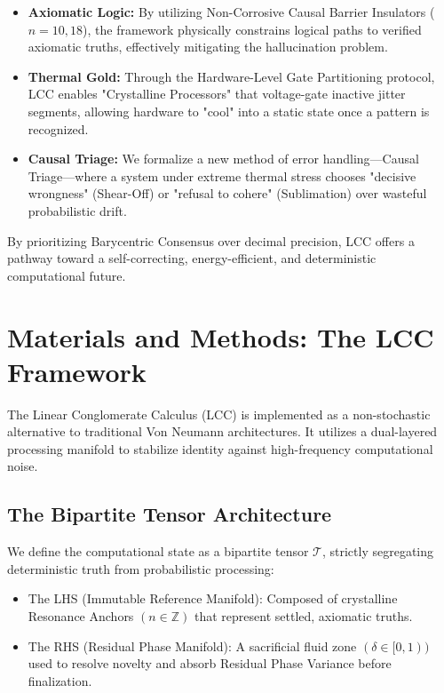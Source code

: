 \documentclass[fleqn,10pt,lineno]{wlpeerj}
\begin{document}
\begin{itemize}
\item\textbf{Axiomatic Logic:} By utilizing Non-Corrosive Causal Barrier Insulators ($n=10, 18$), the framework physically constrains logical paths to verified axiomatic truths, effectively mitigating the hallucination problem.
\item\textbf{Thermal Gold:} Through the Hardware-Level Gate Partitioning protocol, LCC enables "Crystalline Processors" that voltage-gate inactive jitter segments, allowing hardware to "cool" into a static state once a pattern is recognized.
\item\textbf{Causal Triage:} We formalize a new method of error handling—Causal Triage—where a system under extreme thermal stress chooses "decisive wrongness" (Shear-Off) or "refusal to cohere" (Sublimation) over wasteful probabilistic drift.
\end{itemize}

By prioritizing Barycentric Consensus over decimal precision, LCC offers a pathway toward a self-correcting, energy-efficient, and deterministic computational future.

\section*{Materials and Methods: The LCC Framework}
The Linear Conglomerate Calculus (LCC) is implemented as a non-stochastic alternative to traditional Von Neumann architectures. It utilizes a dual-layered processing manifold to stabilize identity against high-frequency computational noise.

\subsection*{The Bipartite Tensor Architecture}
We define the computational state as a bipartite tensor $\mathcal{T}$, strictly segregating deterministic truth from probabilistic processing:
\begin{itemize}
\item The LHS (Immutable Reference Manifold): Composed of crystalline Resonance Anchors $(n \in \mathbb{Z})$ that represent settled, axiomatic truths.
\item The RHS (Residual Phase Manifold): A sacrificial fluid zone $(\delta \in [0, 1))$ used to resolve novelty and absorb Residual Phase Variance before finalization.
\end{itemize}
\medskip
\end{document}
